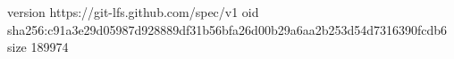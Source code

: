 version https://git-lfs.github.com/spec/v1
oid sha256:c91a3e29d05987d928889df31b56bfa26d00b29a6aa2b253d54d7316390fcdb6
size 189974
